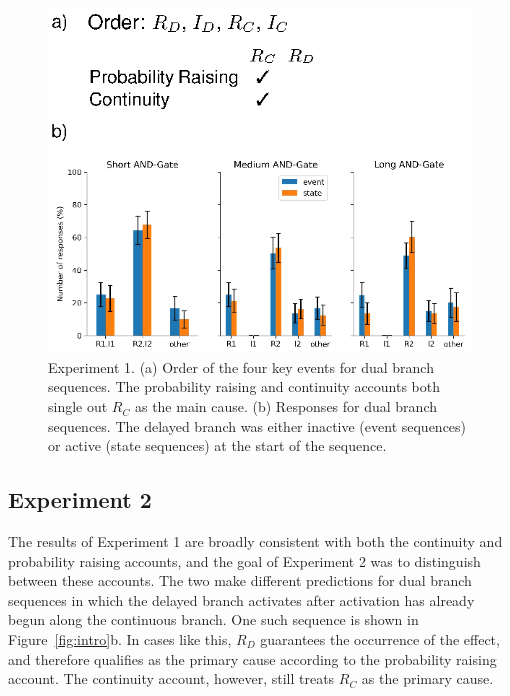 \documentclass[10pt,letterpaper]{article}
\newcommand{\ev}[2]{$#1_#2$}
\begin{document}

\begin{figure}
\begin{center}
\includegraphics{figures/expt1.eps}
\end{center}
\caption{Experiment 1. (a) Order of the four key events for dual branch sequences. The probability raising and continuity accounts both single out \ev{R}{C} as the main cause. (b)  Responses for dual branch sequences. The delayed branch was either inactive (event sequences) or active (state sequences) at the start of the sequence.} 
\label{fig:expt1}
\end{figure}

\subsection{Experiment 2}

The results of Experiment 1 are broadly consistent with both the continuity and probability raising accounts, and the goal of Experiment 2 was to distinguish between these accounts. The two make different predictions for dual branch sequences in which the delayed branch activates after activation has already begun along the continuous branch. One such sequence is shown in Figure~\ref{fig:intro}b. 
In cases like this, \ev{R}{D} guarantees the occurrence of the effect, and therefore qualifies as the primary cause according to the probability raising account. The continuity account, however, still treats \ev{R}{C} as the primary cause.
\end{document}
